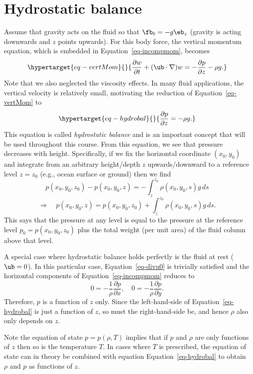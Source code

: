 \documentclass[
  letterpaper,
  twocolumn,
  landscape]{report}
\begin{document}
\hypertarget{sec-hydrostat}{%
\section{Hydrostatic balance}\label{sec-hydrostat}}

Assume that gravity acts on the fluid so that \(\fb_b=-g\eb_z\) (gravity
is acting downwards and \(z\) points upwards). For this body force, the
vertical momentum equation, which is embedded in
Equation~\ref{eq-incompmom}, becomes\\
\begin{equation}\protect\hypertarget{eq-vertMom}{}{
 \frac{\partial w}{\partial t} + (\ub\cdot\nabla)w = - \frac{\partial p}{\partial z} -\rho g.
}\label{eq-vertMom}\end{equation} Note that we also neglected the
viscosity effects. In many fluid applications, the vertical velocity is
relatively small, motivating the reduction of Equation~\ref{eq-vertMom}
to
\begin{equation}\protect\hypertarget{eq-hydrobal}{}{ \frac{\partial p}{\partial z} = -\rho g. }\label{eq-hydrobal}\end{equation}
This equation is called \emph{hydrostatic balance} and is an important
concept that will be used throughout this course. From this equation, we
see that pressure decreases with height. Specifically, if we fix the
horizontal coordinate \((x_0,y_0)\) and integrate from an arbitrary
height/depth \(z\) upwards/downward to a reference level \(z=z_0\)
(e.g., ocean surface or ground) then we find \[
    p(x_0,y_0,z_0)-p(x_0,y_0,z) = -\int_z^{z_0} \rho(x_0,y_0,s) g \,ds 
\] \[
 \Rightarrow\quad p(x_0,y_0,z) = p(x_0,y_0,z_0) + \int_z^{z_0} \rho(x_0,y_0,s) g \,ds.
\] This says that the pressure at any level is equal to the pressure at
the reference level \(p_0 = p(x_0,y_0,z_0)\) plus the total weight (per
unit area) of the fluid column above that level.

A special case where hydrostatic balance holds perfectly is the fluid at
rest (\(\ub = 0\)). In this particular case, Equation~\ref{eq-divu0} is
trivially satisfied and the horizontal components of
Equation~\ref{eq-incompmom} reduces to \[
 0 = -\frac{1}{\rho}\frac{\partial p}{\partial x}, \quad 0 = -\frac{1}{\rho}\frac{\partial p}{\partial y}.
\] Therefore, \(p\) is a function of \(z\) only. Since the
left-hand-side of Equation~\ref{eq-hydrobal} is just a function of
\(z\), so must the right-hand-side be, and hence \(\rho\) also only
depends on \(z\).

Note the equation of state \(p=p(\rho,T)\) implies that if \(p\) and
\(\rho\) are only functions of \(z\) then so is the temperature \(T\).
In cases where \(T\) is prescribed, the equation of state can in theory
be combined with equation Equation~\ref{eq-hydrobal} to obtain \(\rho\)
and \(p\) as functions of \(z\).
\end{document}
